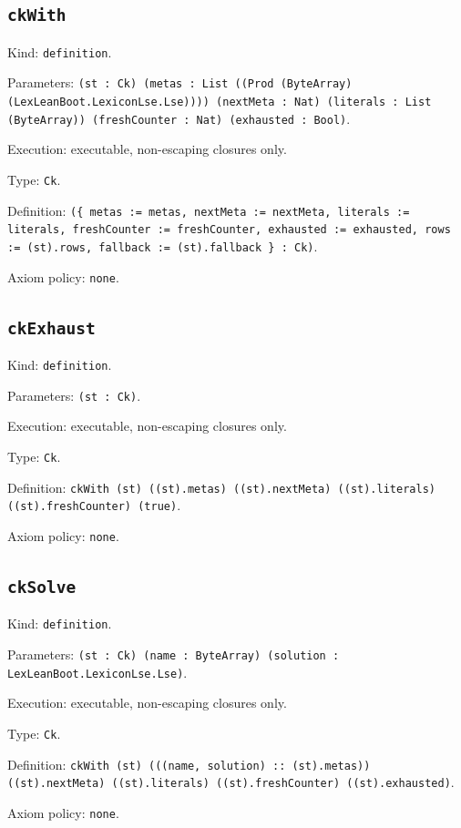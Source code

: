 \documentclass[11pt]{article}
\begin{document}
\subsection*{\texttt{ckWith}}
\noindent Kind: \texttt{definition}.\par
\noindent Parameters: \texttt{(st : Ck) (metas : List ((Prod (ByteArray) (LexLeanBoot.LexiconLse.Lse)))) (nextMeta : Nat) (literals : List (ByteArray)) (freshCounter : Nat) (exhausted : Bool)}.\par
\noindent Execution: executable, non-escaping closures only.\par
\noindent Type: \texttt{Ck}.\par
\noindent Definition: \texttt{(\{ metas := metas, nextMeta := nextMeta, literals := literals, freshCounter := freshCounter, exhausted := exhausted, rows := (st).rows, fallback := (st).fallback \} : Ck)}.\par
\noindent Axiom policy: \texttt{none}.\par
\subsection*{\texttt{ckExhaust}}
\noindent Kind: \texttt{definition}.\par
\noindent Parameters: \texttt{(st : Ck)}.\par
\noindent Execution: executable, non-escaping closures only.\par
\noindent Type: \texttt{Ck}.\par
\noindent Definition: \texttt{ckWith (st) ((st).metas) ((st).nextMeta) ((st).literals) ((st).freshCounter) (true)}.\par
\noindent Axiom policy: \texttt{none}.\par
\subsection*{\texttt{ckSolve}}
\noindent Kind: \texttt{definition}.\par
\noindent Parameters: \texttt{(st : Ck) (name : ByteArray) (solution : LexLeanBoot.LexiconLse.Lse)}.\par
\noindent Execution: executable, non-escaping closures only.\par
\noindent Type: \texttt{Ck}.\par
\noindent Definition: \texttt{ckWith (st) (((name, solution) :: (st).metas)) ((st).nextMeta) ((st).literals) ((st).freshCounter) ((st).exhausted)}.\par
\noindent Axiom policy: \texttt{none}.\par
\end{document}
